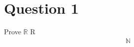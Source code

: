 \documentclass[11pt]{article}
\begin{document}
	\newcommand{\R}{\mathbb{R}}
	\newcommand{\Q}{\mathbb{Q}}
	\newcommand{\Z}{\mathbb{Z}}
	\newcommand{\N}{\mathbb{N}}
	\section*{Question 1}
	
Prove $\R$ R
\begin{align}
	\N
\end{align}	
	
	
	
	
	
	
	
\end{document}
